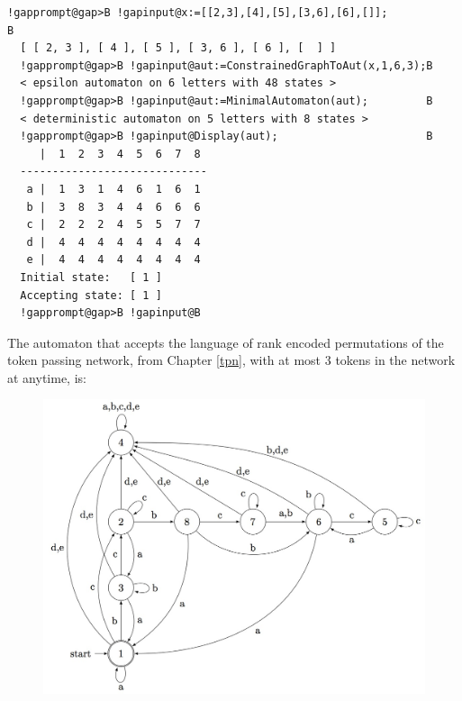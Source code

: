 \documentclass[a4paper,11pt]{report}
\begin{document}
{{{\begin{figure}[H]
\end{figure}   
\begin{Verbatim}[commandchars=!@B,fontsize=\small,frame=single,label=Example]
  !gapprompt@gap>B !gapinput@x:=[[2,3],[4],[5],[3,6],[6],[]];                      B
  [ [ 2, 3 ], [ 4 ], [ 5 ], [ 3, 6 ], [ 6 ], [  ] ]
  !gapprompt@gap>B !gapinput@aut:=ConstrainedGraphToAut(x,1,6,3);B
  < epsilon automaton on 6 letters with 48 states >
  !gapprompt@gap>B !gapinput@aut:=MinimalAutomaton(aut);         B
  < deterministic automaton on 5 letters with 8 states >
  !gapprompt@gap>B !gapinput@Display(aut);                       B
     |  1  2  3  4  5  6  7  8  
  -----------------------------
   a |  1  3  1  4  6  1  6  1  
   b |  3  8  3  4  4  6  6  6  
   c |  2  2  2  4  5  5  7  7  
   d |  4  4  4  4  4  4  4  4  
   e |  4  4  4  4  4  4  4  4  
  Initial state:   [ 1 ]
  Accepting state: [ 1 ]
  !gapprompt@gap>B !gapinput@B
\end{Verbatim}
  The automaton that accepts the language of rank encoded permutations of the
token passing network, from Chapter \ref{tpn}, with at most 3 tokens in the network at anytime, is: \begin{figure}[H]
\begin{center} \leavevmode \includegraphics[scale=0.75]{img/hexc3aut.jpg}
\end{center} \end{figure}   }

 }

 }

 
\end{document}
